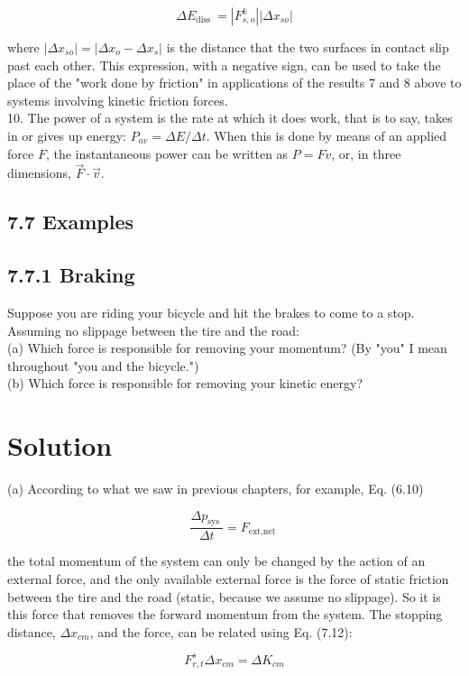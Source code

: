 \documentclass[10pt]{article}
\begin{document}
$$
\Delta E_{\text {diss }}=\left|F_{s, o}^{k}\right|\left|\Delta x_{s o}\right|
$$

where $\left|\Delta x_{s o}\right|=\left|\Delta x_{o}-\Delta x_{s}\right|$ is the distance that the two surfaces in contact slip past each other. This expression, with a negative sign, can be used to take the place of the "work done by friction" in applications of the results 7 and 8 above to systems involving kinetic friction forces.\\
10. The power of a system is the rate at which it does work, that is to say, takes in or gives up energy: $P_{a v}=\Delta E / \Delta t$. When this is done by means of an applied force $F$, the instantaneous power can be written as $P=F v$, or, in three dimensions, $\vec{F} \cdot \vec{v}$.

\subsection*{7.7 Examples}
\subsection*{7.7.1 Braking}
Suppose you are riding your bicycle and hit the brakes to come to a stop. Assuming no slippage between the tire and the road:\\
(a) Which force is responsible for removing your momentum? (By "you" I mean throughout "you and the bicycle.")\\
(b) Which force is responsible for removing your kinetic energy?

\section*{Solution}
(a) According to what we saw in previous chapters, for example, Eq. (6.10)


\begin{equation*}
\frac{\Delta p_{\text {sys }}}{\Delta t}=F_{\text {ext,net }} \tag{7.32}
\end{equation*}


the total momentum of the system can only be changed by the action of an external force, and the only available external force is the force of static friction between the tire and the road (static, because we assume no slippage). So it is this force that removes the forward momentum from the system. The stopping distance, $\Delta x_{c m}$, and the force, can be related using Eq. (7.12):


\begin{equation*}
F_{r, t}^{s} \Delta x_{c m}=\Delta K_{c m} \tag{7.33}
\end{equation*}
\end{document}
